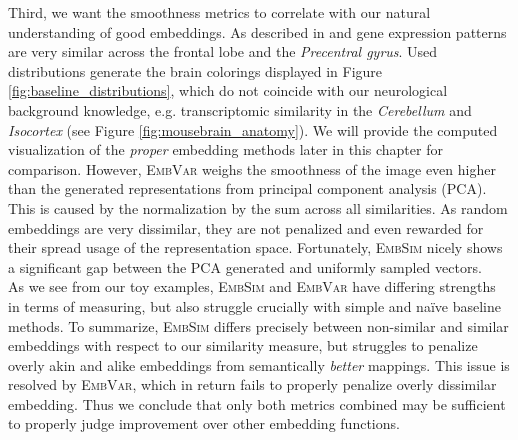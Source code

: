 \documentclass[]{article}
\begin{document}
Third, we want the smoothness metrics to correlate with our natural understanding of good embeddings. As described in \citet{ValkShapingBrainStructure2020} and \citet{Partel2020} gene expression patterns are very similar across the frontal lobe and the \textit{Precentral gyrus}. Used distributions generate the brain colorings displayed in Figure \ref{fig:baseline_distributions}, which do not coincide with our neurological background knowledge, e.g. transcriptomic similarity in the \textit{Cerebellum} and \textit{Isocortex} (see Figure \ref{fig:mousebrain_anatomy}). We will provide the computed visualization of the \textit{proper} embedding methods later in this chapter for comparison. However, \textsc{EmbVar} weighs the smoothness of the image even higher than the generated representations from principal component analysis (PCA). This is caused by the normalization by the sum across all similarities. As random embeddings are very dissimilar, they are not penalized and even rewarded for their spread usage of the representation space. Fortunately, \textsc{EmbSim} nicely shows a significant gap between the PCA generated and uniformly sampled vectors.\\

As we see from our toy examples, \textsc{EmbSim} and \textsc{EmbVar} have differing strengths in terms of measuring, but also struggle crucially with simple and na\"ive baseline methods. To summarize, \textsc{EmbSim} differs precisely between non-similar and similar embeddings with respect to our similarity measure, but struggles to penalize overly akin and alike embeddings from semantically \textit{better} mappings. This issue is resolved by \textsc{EmbVar}, which in return fails to properly penalize overly dissimilar embedding. Thus we conclude that only both metrics combined may be sufficient to properly judge improvement over other embedding functions.
\end{document}

